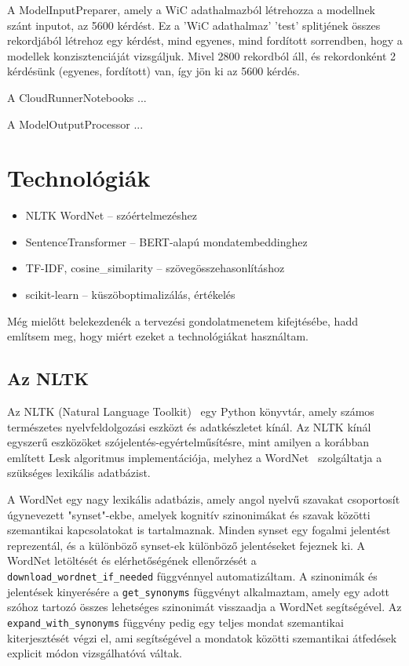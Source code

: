 \documentclass[12pt]{report}
\theoremstyle{definition}
\begin{document}
A ModelInputPreparer, amely a WiC adathalmazból létrehozza a modellnek szánt inputot, az 5600 kérdést. Ez a 'WiC adathalmaz' 'test' splitjének összes rekordjából létrehoz egy kérdést, mind egyenes, mind fordított sorrendben, hogy a modellek konzisztenciáját vizsgáljuk. Mivel 2800 rekordból áll, és rekordonként 2 kérdésünk (egyenes, fordított) van, így jön ki az 5600 kérdés.

A CloudRunnerNotebooks ...



A ModelOutputProcessor ...



\section{Technológiák}
\begin{itemize}
\item NLTK WordNet – szóértelmezéshez

\item SentenceTransformer – BERT-alapú mondatembeddinghez

\item TF-IDF, cosine\_similarity – szövegösszehasonlításhoz

\item scikit-learn – küszöboptimalizálás, értékelés
\end{itemize}

Még mielőtt belekezdenék a tervezési gondolatmenetem kifejtésébe, hadd említsem meg, hogy miért ezeket a technológiákat használtam.

\subsection{Az NLTK}
Az NLTK (Natural Language Toolkit)~\cite{bird2004nltk} egy Python könyvtár, amely számos természetes nyelvfeldolgozási eszközt és adatkészletet kínál. Az NLTK kínál egyszerű eszközöket szójelentés-egyértelműsítésre, mint amilyen a korábban említett Lesk algoritmus implementációja, melyhez a WordNet~\cite{miller1994wordnet} szolgáltatja a szükséges lexikális adatbázist.

A WordNet egy nagy lexikális adatbázis, amely angol nyelvű szavakat csoportosít úgynevezett "synset"-ekbe, amelyek kognitív szinonimákat és szavak közötti szemantikai kapcsolatokat is tartalmaznak. Minden synset egy fogalmi jelentést reprezentál, és a különböző synset-ek különböző jelentéseket fejeznek ki. %
A WordNet letöltését és elérhetőségének ellenőrzését a \texttt{download\_wordnet\_if\_needed} függvénnyel automatizáltam. A szinonimák és jelentések kinyerésére a \texttt{get\_synonyms} függvényt alkalmaztam, amely egy adott szóhoz tartozó összes lehetséges szinonimát visszaadja a WordNet segítségével. Az \texttt{expand\_with\_synonyms} függvény pedig egy teljes mondat szemantikai kiterjesztését végzi el, ami segítségével a mondatok közötti szemantikai átfedések explicit módon vizsgálhatóvá váltak.
\end{document}
